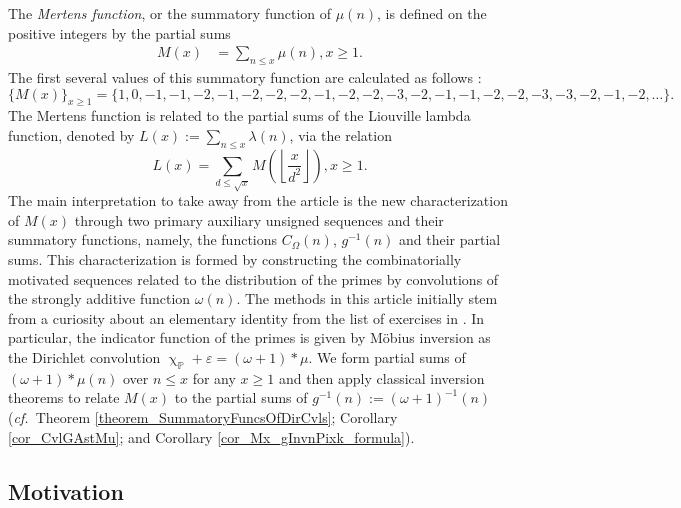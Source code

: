 \documentclass[11pt,reqno,a4letter]{article}
\numberwithin{figure}{section}
\numberwithin{table}{section}
\newcommand{\cf}{\textit{cf.\ }}
\newcommand{\seqnum}[1]{\href{http://oeis.org/#1}{\color{ProcessBlue}{\underline{#1}}}}
\renewcommand{\chi}{\upchi}
\newcommand{\Floor}[2]{\ensuremath{\left\lfloor \frac{#1}{#2} \right\rfloor}}
\theoremstyle{plain}
\numberwithin{theorem}{section}
\theoremstyle{definition}
\begin{document}
The \emph{Mertens function}, or the summatory function of $\mu(n)$, is defined on the 
positive integers by the partial sums  
\begin{align*} 
M(x) & = \sum_{n \leq x} \mu(n), x \geq 1. 
\end{align*} 
The first several values of this 
summatory function are calculated as follows 
\cite[\seqnum{A008683}; \seqnum{A002321}]{OEIS}: 
\[
\{M(x)\}_{x \geq 1} = \{1, 0, -1, -1, -2, -1, -2, -2, -2, -1, -2, -2, -3, -2, 
     -1, -1, -2, -2, -3, -3, -2, -1, -2, \ldots\}. 
\] 
The Mertens function is related 
to the partial sums of the Liouville lambda function, 
denoted by $L(x) := \sum\limits_{n \leq x} \lambda(n)$, 
via the relation \cite{HUMPHRIES-JNT-2013,LEHMAN-1960} 
\cite[\seqnum{A008836}; \seqnum{A002819}]{OEIS}
\[
L(x) = \sum_{d \leq \sqrt{x}} M\left(\Floor{x}{d^2}\right), x \geq 1. 
\] 
The main interpretation to take away from the article is 
the new characterization of $M(x)$ through two primary 
auxiliary unsigned sequences and their 
summatory functions, namely, the functions $C_{\Omega}(n)$, $g^{-1}(n)$ and their 
partial sums. This characterization is formed by constructing the 
combinatorially motivated sequences related to the distribution of the primes 
by convolutions of the strongly additive function $\omega(n)$. 
The methods in this article initially stem from a 
curiosity about an elementary identity from 
the list of exercises in \cite[\S 2; \cf \S 11]{APOSTOLANUMT}. 
In particular, the indicator function of the primes is given by M\"obius inversion as the 
Dirichlet convolution $\chi_{\mathbb{P}} + \varepsilon = (\omega + 1) \ast \mu$. 
We form partial sums of $(\omega + 1) \ast \mu(n)$ over $n \leq x$ for 
any $x \geq 1$ and then apply classical inversion theorems to relate  
$M(x)$ to the partial sums of $g^{-1}(n) := (\omega+1)^{-1}(n)$ 
(\cf Theorem \ref{theorem_SummatoryFuncsOfDirCvls}; 
Corollary \ref{cor_CvlGAstMu}; and  
Corollary \ref{cor_Mx_gInvnPixk_formula}). 

\subsection{Motivation} 
\end{document}
